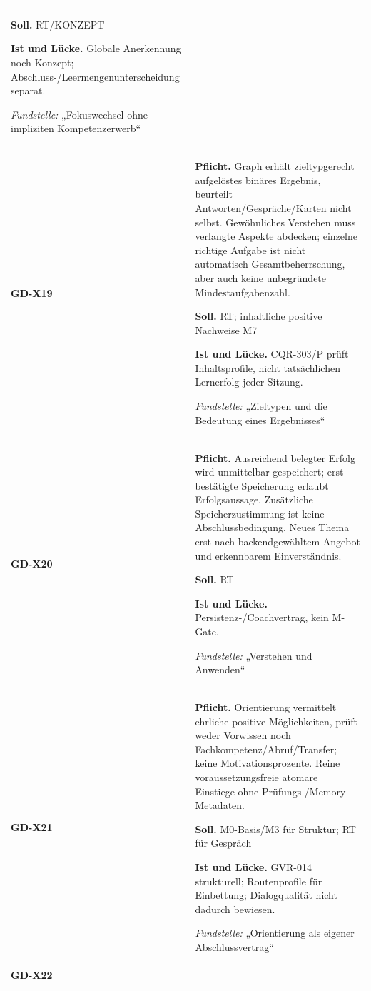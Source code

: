 \begin{longtable}{@{}P{20mm}P{128mm}@{}}
\textbf{Soll.} RT/KONZEPT\par\smallskip
\textbf{Ist und Lücke.} Globale Anerkennung noch Konzept; Abschluss-/Leermengenunterscheidung separat.\par\smallskip
\emph{Fundstelle:} „Fokuswechsel ohne impliziten Kompetenzerwerb“\\\addlinespace[5pt]
\label{rule:GD-X19}\textbf{GD-X19} &
\textbf{Pflicht.} Graph erhält zieltypgerecht aufgelöstes binäres Ergebnis, beurteilt Antworten/Gespräche/Karten nicht selbst. Gewöhnliches Verstehen muss verlangte Aspekte abdecken; einzelne richtige Aufgabe ist nicht automatisch Gesamtbeherrschung, aber auch keine unbegründete Mindestaufgabenzahl.\par\smallskip
\textbf{Soll.} RT; inhaltliche positive Nachweise M7\par\smallskip
\textbf{Ist und Lücke.} CQR-303/P prüft Inhaltsprofile, nicht tatsächlichen Lernerfolg jeder Sitzung.\par\smallskip
\emph{Fundstelle:} „Zieltypen und die Bedeutung eines Ergebnisses“\\\addlinespace[5pt]
\label{rule:GD-X20}\textbf{GD-X20} &
\textbf{Pflicht.} Ausreichend belegter Erfolg wird unmittelbar gespeichert; erst bestätigte Speicherung erlaubt Erfolgsaussage. Zusätzliche Speicherzustimmung ist keine Abschlussbedingung. Neues Thema erst nach backendgewähltem Angebot und erkennbarem Einverständnis.\par\smallskip
\textbf{Soll.} RT\par\smallskip
\textbf{Ist und Lücke.} Persistenz-/Coachvertrag, kein M-Gate.\par\smallskip
\emph{Fundstelle:} „Verstehen und Anwenden“\\\addlinespace[5pt]
\label{rule:GD-X21}\textbf{GD-X21} &
\textbf{Pflicht.} Orientierung vermittelt ehrliche positive Möglichkeiten, prüft weder Vorwissen noch Fachkompetenz/Abruf/Transfer; keine Motivationsprozente. Reine voraussetzungsfreie atomare Einstiege ohne Prüfungs-/Memory-Metadaten.\par\smallskip
\textbf{Soll.} M0-Basis/M3 für Struktur; RT für Gespräch\par\smallskip
\textbf{Ist und Lücke.} GVR-014 strukturell; Routenprofile für Einbettung; Dialogqualität nicht dadurch bewiesen.\par\smallskip
\emph{Fundstelle:} „Orientierung als eigener Abschlussvertrag“\\\addlinespace[5pt]
\label{rule:GD-X22}\textbf{GD-X22} &

\end{longtable}
